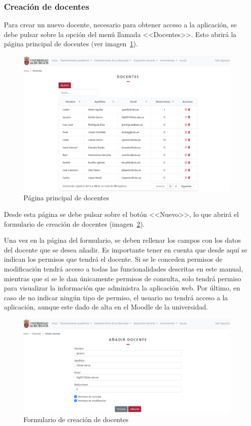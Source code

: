\subsubsection{Creación de docentes}
Para crear un nuevo docente, necesario para obtener acceso a la aplicación, se debe pulsar sobre la opción del menú llamada <<Docentes>>.
Esto abrirá la página principal de docentes (ver imagen~\ref{pag:docentes}).

\begin{figure}
	\centering
	\includegraphics[width=\textwidth]{../img/Anexos/Manual usuario/docentes.png}
	\caption{Página principal de docentes}\label{pag:docentes}
\end{figure}

Desde esta página se debe pulsar sobre el botón <<Nuevo>>, lo que abrirá el formulario de creación de docentes (imagen~\ref{pag:formDocente}).

Una vez en la página del formulario, se deben rellenar los campos con los datos del docente que se desea añadir.
Es importante tener en cuenta que desde aquí se indican los permisos que tendrá el docente.
Si se le conceden permisos de modificación tendrá acceso a todas las funcionalidades descritas en este manual, mientras que si se le dan únicamente permisos de consulta, solo tendrá permiso para visualizar la información que administra la aplicación web.
Por último, en caso de no indicar ningún tipo de permiso, el usuario no tendrá acceso a la aplicación, aunque este dado de alta en el Moodle de la universidad.

\begin{figure}
	\centering
	\includegraphics[width=\textwidth]{../img/Anexos/Manual usuario/formDocente.png}
	\caption{Formulario de creación de docentes}\label{pag:formDocente}
\end{figure}


